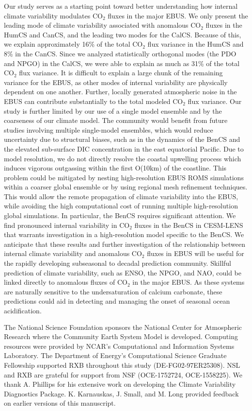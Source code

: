 \documentclass[hvmath, online,bgd]{copernicus_discussions}
\begin{document}
Our study serves as a starting point toward better understanding how internal climate variability modulates CO$_{2}$ fluxes in the major EBUS. We only present the leading mode of climate variability associated with anomalous CO$_{2}$ fluxes in the HumCS and CanCS, and the leading two modes for the CalCS. Because of this, we explain approximately 16\% of the total CO$_{2}$ flux variance in the HumCS and 8\% in the CanCS. Since we analyzed statistically orthogonal modes (the PDO and NPGO) in the CalCS, we were able to explain as much as 31\% of the total CO$_{2}$ flux variance. It is difficult to explain a large chunk of the remaining variance for the EBUS, as other modes of internal variability are physically dependent on one another. Further, locally generated atmospheric noise in the EBUS can contribute substantially to the total modeled CO$_{2}$ flux variance. Our study is further limited by our use of a single model ensemble and by the coarseness of our climate model. The community would benefit from future studies involving multiple single-model ensembles, which would reduce uncertainty due to structural biases, such as in the dynamics of the BenCS and the elevated sub-surface DIC concentration in the east equatorial Pacific. Due to model resolution, we do not directly resolve the coastal upwelling process which induces vigorous outgassing within the first O(10km) of the coastline. This problem could be mitigated by nesting high-resolution EBUS ROMS simulations within a coarser global ensemble or by using regional mesh refinement techniques. This would allow the remote propagation of climate variability into the EBUS, while avoiding the high computational cost of running multiple high-resolution global simulations. In particular, the BenCS requires significant attention. We find pronounced internal variability in CO$_{2}$ fluxes in the BenCS in CESM-LENS that warrants investigation in a high-resolution model specific to the BenCS. We anticipate that these results and further investigation of the relationship between internal climate variability and anomalous CO$_{2}$ fluxes in EBUS will be useful for the rapidly developing subseasonal to decadal prediction community. Skillful prediction of climate variability, such as ENSO, the NPGO, and NAO, could be linked directly to anomalous fluxes of CO$_{2}$ in the major EBUS.  As these systems are naturally sensitive to the undersaturation of calcium carbonate, these predictions could aid in detecting and managing the onset of seasonal ocean acidification. 

\begin{acknowledgements}
The National Science Foundation sponsors the National Center for Atmospheric Research where the Community Earth System Model is developed. Computing resources were provided by NCAR's Computational and Information Systems Laboratory. The Department of Energy's Computational Science Graduate Fellowship supported RXB throughout this study (DE-FG02-97ER25308). NSL and RXB are grateful for support from NSF (OCE-1752724,  OCE-1558225). We thank A. Phillips for his extensive work on developing the Climate Variability Diagnostics Package.  K. Karnauskas, J. Small, and M. Long provided feedback on earlier versions of this manuscript.
\end{acknowledgements}
\end{document}
